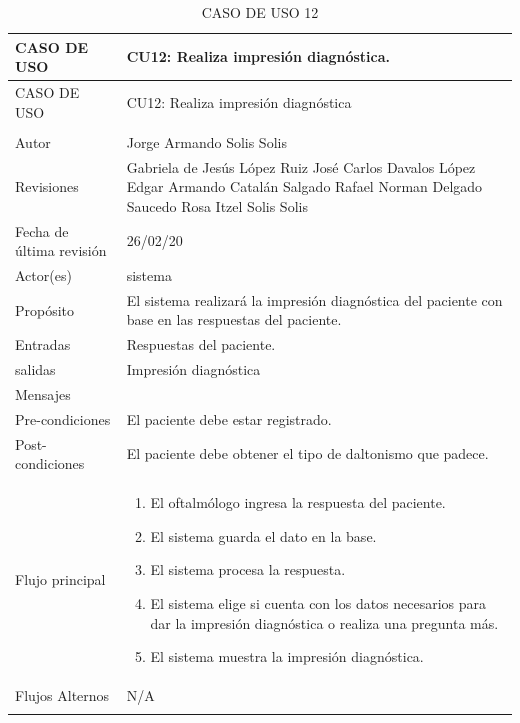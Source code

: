 \documentclass[10pt]{article}
\begin{document}
\newpage 

\begin{longtable}{|p{3.8cm}|p{10.8cm}|}
\hline
CASO DE USO & CU12: Realiza impresión diagnóstica.\\
\hline 
\endfirsthead

\hline

CASO DE USO & CU12: Realiza impresión diagnóstica\\
\hline 
\endhead

\multicolumn{2}{c}{}
\endfoot

\endlastfoot
\hline
versión & 1\\
\hline
Autor & Jorge Armando Solis Solis\\
\hline
Revisiones & Gabriela de Jesús López Ruiz\newline
José Carlos Davalos López\newline
Edgar Armando Catalán Salgado\newline
Rafael Norman Delgado Saucedo\newline
Rosa Itzel Solis Solis
\\

\hline
Fecha de última revisión & 26/02/20\\
\hline
Actor(es) & sistema\\
\hline
Propósito & El sistema realizará la impresión diagnóstica del paciente con base en las respuestas del paciente.\\
\hline
Entradas & Respuestas del paciente.\\
\hline
salidas & Impresión diagnóstica\\
\hline
Mensajes & \\
\hline
Pre-condiciones & El paciente debe estar registrado.\\
\hline
Post-condiciones & El paciente debe obtener el tipo de daltonismo que padece.\\
\hline
Flujo principal & \begin{enumerate}
    \item El oftalmólogo ingresa la respuesta del paciente.
    \item El sistema guarda el dato en la base.
    \item El sistema procesa la respuesta.
    \item El sistema elige si cuenta con los datos necesarios para dar la impresión diagnóstica o realiza una pregunta más.
    \item El sistema muestra la impresión diagnóstica.
\end{enumerate}
    \\
\hline
Flujos Alternos & 
    N/A\\
\hline
\caption{CASO DE USO 12}
\label{tabla1}
\end{longtable}
\end{document}
